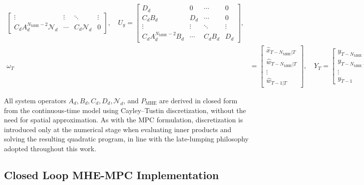 \begin{equation}
\begin{aligned}
\begin{bmatrix}
        \vdots & \vdots & \ddots & \vdots \\
        C_d A_d^{{N_{\mathrm{MHE}}}-2} \mathcal{N}_d & \cdots & C_d \mathcal{N}_d & 0
        \end{bmatrix}, \quad
        U_y =
        \begin{bmatrix}
        D_d & 0 & \cdots & 0 \\
        C_d B_d & D_d & \cdots & 0 \\
        \vdots & \vdots & \ddots & \vdots \\
        C_d A_d^{{N_{\mathrm{MHE}}}-2} B_d & \cdots & C_d B_d & D_d
        \end{bmatrix}, \\[1ex]
        \omega_T &=
        \left[
        \begin{array}{c}
        \hat{x}_{T-N_{\mathrm{MHE}}|T} \\
        \hline
        \hat{w}_{T-N_{\mathrm{MHE}}|T} \\
        \vdots \\
        \hat{w}_{T-1|T}
        \end{array}
        \right], \quad
        Y_T =
        \begin{bmatrix}
        y_{T-{N_{\mathrm{MHE}}}} \\
        y_{T-{N_{\mathrm{MHE}}}+1} \\
        \vdots \\
        y_{T-1}
        \end{bmatrix} \quad 
        U_T =
        \begin{bmatrix}
        u_{T-{N_{\mathrm{MHE}}}} \\
        u_{T-{N_{\mathrm{MHE}}}+1} \\
        \vdots \\
        u_{T-1}
        \end{bmatrix}
    \end{aligned}
\end{equation}


All system operators $A_d, B_d, C_d, D_d, \mathcal{N}_d$, and $P_{\mathrm{MHE}}$ are derived in closed form from the continuous-time model using Cayley--Tustin discretization, without the need for spatial approximation. As with the MPC formulation, discretization is introduced only at the numerical stage when evaluating inner products and solving the resulting quadratic program, in line with the late-lumping philosophy adopted throughout this work.

\subsection{Closed Loop MHE-MPC Implementation} \label{sec:mhe_mpc}

